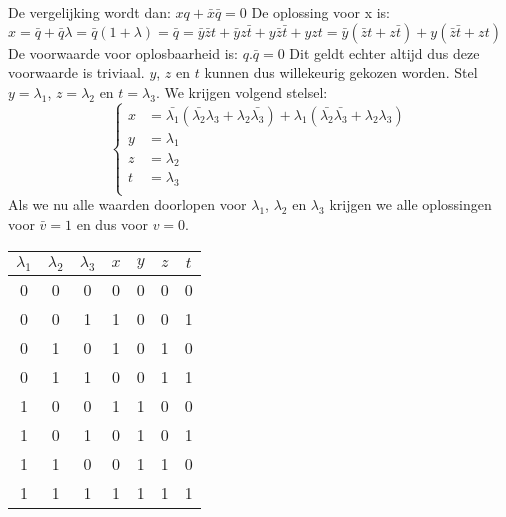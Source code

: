 \documentclass[12pt]{article}
\newcommand{\ov}[1]{\bar{#1}}
\begin{document}
De vergelijking wordt dan:
\vspace{2mm}
\newline
$xq + \ov{x}\ov{q} = 0$
\vspace{2mm}
\newline
De oplossing voor x is:
\vspace{2mm}
\newline
$x = \ov{q} + \ov{q}\lambda = \ov{q}(1+\lambda) = \ov{q} = \ov{y}\ov{z}t + \ov{y}z\ov{t} + y\ov{z}\ov{t} + yzt = \ov{y}(\ov{z}t + z\ov{t}) + y(\ov{z}\ov{t} + zt)$
\vspace{2mm}
\newline
De voorwaarde voor oplosbaarheid is:
\vspace{2mm}
\newline
$q.\ov{q} = 0$
\vspace{2mm}
\newline
Dit geldt echter altijd dus deze voorwaarde is triviaal. $y$, $z$ en $t$ kunnen dus willekeurig gekozen worden. Stel $y = \lambda_{1}$, $z = \lambda_{2}$ en $t = \lambda_{3}$.
\vspace{2mm}
\newline
We krijgen volgend stelsel:
\vspace{2mm}
\newline
\[  
	\begin{cases}
	    x &= \ov{\lambda_{1}}(\ov{\lambda_{2}}\lambda_{3} + \lambda_{2}\ov{\lambda_{3}})+\lambda_{1}(\ov{\lambda_{2}}\ov{\lambda_{3}}+\lambda_{2}\lambda_{3})\\
	    y &= \lambda_{1}\\
	    z &= \lambda_{2}\\
	    t &= \lambda_{3}\\
  	\end{cases}
\]
\vspace{2mm}
\newline
Als we nu alle waarden doorlopen voor  $\lambda_{1}$, $\lambda_{2}$ en $\lambda_{3}$ krijgen we alle oplossingen voor $\ov{v} = 1$ en dus voor $v = 0$.

\begin{table}[H]
\centering
\begin{tabular}{|c|c|c||c|c|c|c|}
	\hline
	\bf{$\lambda_{1}$} & \bf{$\lambda_{2}$} & \bf{$\lambda_{3}$} & \bf{$x$} & \bf{$y$} & \bf{$z$} & \bf{$t$} \\
	\hline
	0 & 0 & 0   &   0 & 0 & 0 & 0 \\
	0 & 0 & 1   &   1 & 0 & 0 & 1 \\
	0 & 1 & 0   &   1 & 0 & 1 & 0 \\
	0 & 1 & 1   &   0 & 0 & 1 & 1 \\
	1 & 0 & 0   &   1 & 1 & 0 & 0 \\
	1 & 0 & 1   &   0 & 1 & 0 & 1 \\
	1 & 1 & 0   &   0 & 1 & 1 & 0 \\
	1 & 1 & 1   &   1 & 1 & 1 & 1 \\
	\hline
\end{tabular}
\end{table}
\end{document}

